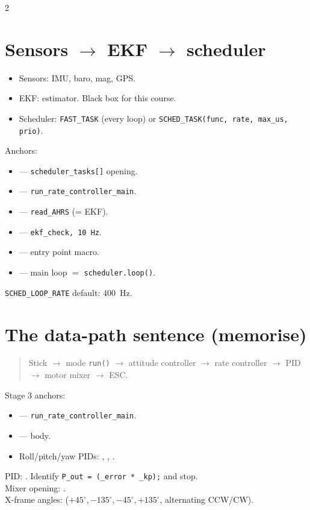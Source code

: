 \documentclass[a4paper,9pt,landscape]{extarticle}
\begin{document}
\begin{multicols*}{2}
\columnbreak

\section*{Sensors $\rightarrow$ EKF $\rightarrow$ scheduler}
\begin{itemize}
  \item Sensors: IMU, baro, mag, GPS.
  \item EKF: estimator. Black box for this course.
  \item Scheduler: \texttt{FAST\_TASK} (every loop) or \texttt{SCHED\_TASK(func, rate, max\_us, prio)}.
\end{itemize}
Anchors:
\begin{itemize}
  \item {} --- \texttt{scheduler\_tasks[]} opening.
  \item {} --- \texttt{run\_rate\_controller\_main}.
  \item {} --- \texttt{read\_AHRS} (= EKF).
  \item {} --- \texttt{ekf\_check, 10~Hz}.
  \item {} --- entry point macro.
  \item {} --- main loop $=$ \texttt{scheduler.loop()}.
\end{itemize}
\texttt{SCHED\_LOOP\_RATE} default: 400~Hz.

\section*{The data-path sentence (memorise)}
\begin{quote}\small
Stick $\rightarrow$ mode \texttt{run()} $\rightarrow$ attitude controller $\rightarrow$ rate controller $\rightarrow$ PID $\rightarrow$ motor mixer $\rightarrow$ ESC.
\end{quote}
Stage 3 anchors:
\begin{itemize}
  \item {} --- \texttt{run\_rate\_controller\_main}.
  \item {} --- body.
  \item Roll/pitch/yaw PIDs: , , .
\end{itemize}
PID: . Identify \texttt{P\_out = (\_error * \_kp);} and stop.\\
Mixer opening: .\\
X-frame angles:  ($+45^\circ, -135^\circ, -45^\circ, +135^\circ$, alternating CCW/CW).


\end{multicols*}
\end{document}
